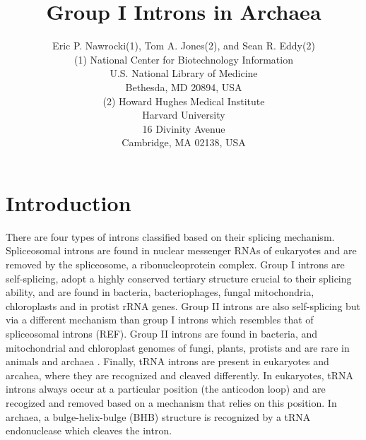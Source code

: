 \documentclass[11pt]{article}
\begin{document}
\title{Group I Introns in Archaea}
\author{Eric P. Nawrocki(1), Tom A. Jones(2), and Sean R. Eddy(2)\\
(1) National Center for Biotechnology Information \\
U.S. National Library of Medicine \\
Bethesda, MD 20894, USA \\
(2) Howard Hughes Medical Institute \\
Harvard University \\
16 Divinity Avenue \\
Cambridge, MA 02138, USA 
}
\maketitle





\section{Introduction}

There are four types of introns classified based on their splicing
mechanism. Spliceosomal introns are found in nuclear messenger RNAs of
eukaryotes and are removed by the spliceosome, a ribonucleoprotein
complex. Group I introns are self-splicing\citep{Cech82}, adopt a
highly conserved tertiary structure crucial to their splicing ability,
and are found in bacteria, bacteriophages, fungal mitochondria,
chloroplasts and in protist rRNA genes.  Group II introns are also
self-splicing but via a different mechanism than group I introns which
resembles that of spliceosomal introns (REF). Group II introns are
found in bacteria, and mitochondrial and chloroplast genomes of fungi,
plants, protists and are rare in animals and archaea
\citep{Rest03}. Finally, tRNA introns are present in eukaryotes and
arcahea, where they are recognized and cleaved differently. In
eukaryotes, tRNA introns always occur at a particular position (the
anticodon loop) and are recogized and removed based on a mechanism
that relies on this position. In archaea, a bulge-helix-bulge (BHB)
structure is recognized by a tRNA endonuclease which cleaves the
intron. 
\end{document}
